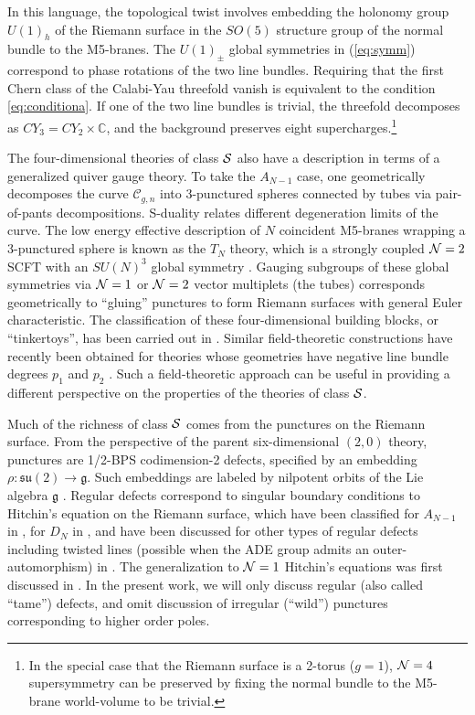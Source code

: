 \documentclass[a4paper,11pt]{article}
\def\CN{{\cal N}}
\def\CS{{\cal S}}
\newcommand{\mc}[1]{\mathcal{ #1} }
\begin{document}
In this language, the topological twist involves embedding the holonomy group $U(1)_h$ of the Riemann surface in the $SO(5)$ structure group of the normal bundle to the M5-branes. The $U(1)_\pm$ global symmetries in (\ref{eq:symm}) correspond to phase rotations of the two line bundles. Requiring that the first Chern class of the Calabi-Yau threefold vanish is equivalent to the condition \eqref{eq:conditiona}. If one of the two line bundles is trivial, the threefold decomposes as $CY_3=CY_2\times \mathbb{C}$, and the background preserves eight supercharges.\footnote{In the special case that the Riemann surface is a 2-torus ($g=1$), $\CN=4$ supersymmetry can be preserved by fixing the normal bundle to the M5-brane world-volume to be trivial.}


The four-dimensional theories of class $\CS$ also have a description in terms of a generalized quiver gauge theory. To take the $A_{N-1}$ case, one geometrically  decomposes the curve $\mc{C}_{g,n}$ into 3-punctured spheres connected by tubes via pair-of-pants decompositions. S-duality relates different degeneration limits of the curve. The low energy effective description of $N$ coincident M5-branes wrapping a 3-punctured sphere is known as the $T_N$ theory, which is a strongly coupled $\CN=2$ SCFT with an $SU(N)^3$ global symmetry \cite{Gaiotto:2009we}. Gauging subgroups of these global symmetries via $\CN=1$ or $\CN=2$ vector multiplets (the tubes) corresponds geometrically to ``gluing'' punctures to form Riemann surfaces with general Euler characteristic. The classification of these four-dimensional building blocks, or ``tinkertoys'', has been carried out in \cite{Chacaltana:2010ks, Chacaltana:2011ze, Chacaltana:2014jba, Chacaltana:2017boe,Chcaltana:2018zag}. Similar field-theoretic constructions have recently been obtained for theories whose geometries have negative line bundle degrees $p_1$ and $p_2$ \cite{Agarwal:2015vla,Fazzi:2016eec,Nardoni:2016ffl}. Such a field-theoretic approach can be useful in providing a different perspective on the properties of the theories of class $\CS$.


Much of the richness of class $\CS$ comes from the punctures on the Riemann surface. From the perspective of the parent six-dimensional $(2,0)$ theory, punctures are 1/2-BPS codimension-2 defects,  specified by an embedding $\rho:\mathfrak{su}(2)\to \mathfrak{g}$. Such embeddings are labeled by nilpotent orbits of the Lie algebra $\mathfrak{g}$ \cite{Chacaltana:2012zy}. Regular defects correspond to singular boundary conditions to Hitchin's equation on the Riemann surface, which have been classified for $A_{N-1}$ in \cite{Gaiotto:2009gz}, for $D_N$ in \cite{Tachikawa:2009rb}, and have been discussed for other types of regular defects including twisted lines (possible when the ADE group admits an outer-automorphism) in \cite{Tachikawa:2010vg, Chacaltana:2012zy,Chacaltana:2013oka,Chacaltana:2015bna}. The generalization to $\CN=1$ Hitchin's equations was first discussed in \cite{Xie:2013gma}. In the present work, we will only discuss regular (also called ``tame'') defects, and omit discussion of irregular (``wild'') punctures corresponding to higher order poles. 
\end{document}
